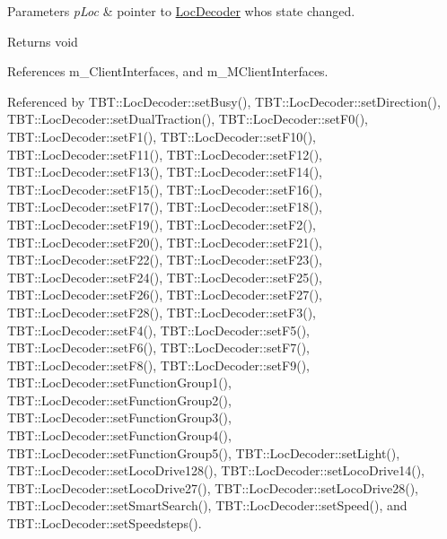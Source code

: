 \begin{DoxyParams}{Parameters}
{\em p\+Loc} & pointer to \hyperlink{classTBT_1_1LocDecoder}{Loc\+Decoder} who\textquotesingle{}s state changed.\\
\hline
\end{DoxyParams}
\begin{DoxyReturn}{Returns}
void 
\end{DoxyReturn}


References m\+\_\+\+Client\+Interfaces, and m\+\_\+\+M\+Client\+Interfaces.



Referenced by T\+B\+T\+::\+Loc\+Decoder\+::set\+Busy(), T\+B\+T\+::\+Loc\+Decoder\+::set\+Direction(), T\+B\+T\+::\+Loc\+Decoder\+::set\+Dual\+Traction(), T\+B\+T\+::\+Loc\+Decoder\+::set\+F0(), T\+B\+T\+::\+Loc\+Decoder\+::set\+F1(), T\+B\+T\+::\+Loc\+Decoder\+::set\+F10(), T\+B\+T\+::\+Loc\+Decoder\+::set\+F11(), T\+B\+T\+::\+Loc\+Decoder\+::set\+F12(), T\+B\+T\+::\+Loc\+Decoder\+::set\+F13(), T\+B\+T\+::\+Loc\+Decoder\+::set\+F14(), T\+B\+T\+::\+Loc\+Decoder\+::set\+F15(), T\+B\+T\+::\+Loc\+Decoder\+::set\+F16(), T\+B\+T\+::\+Loc\+Decoder\+::set\+F17(), T\+B\+T\+::\+Loc\+Decoder\+::set\+F18(), T\+B\+T\+::\+Loc\+Decoder\+::set\+F19(), T\+B\+T\+::\+Loc\+Decoder\+::set\+F2(), T\+B\+T\+::\+Loc\+Decoder\+::set\+F20(), T\+B\+T\+::\+Loc\+Decoder\+::set\+F21(), T\+B\+T\+::\+Loc\+Decoder\+::set\+F22(), T\+B\+T\+::\+Loc\+Decoder\+::set\+F23(), T\+B\+T\+::\+Loc\+Decoder\+::set\+F24(), T\+B\+T\+::\+Loc\+Decoder\+::set\+F25(), T\+B\+T\+::\+Loc\+Decoder\+::set\+F26(), T\+B\+T\+::\+Loc\+Decoder\+::set\+F27(), T\+B\+T\+::\+Loc\+Decoder\+::set\+F28(), T\+B\+T\+::\+Loc\+Decoder\+::set\+F3(), T\+B\+T\+::\+Loc\+Decoder\+::set\+F4(), T\+B\+T\+::\+Loc\+Decoder\+::set\+F5(), T\+B\+T\+::\+Loc\+Decoder\+::set\+F6(), T\+B\+T\+::\+Loc\+Decoder\+::set\+F7(), T\+B\+T\+::\+Loc\+Decoder\+::set\+F8(), T\+B\+T\+::\+Loc\+Decoder\+::set\+F9(), T\+B\+T\+::\+Loc\+Decoder\+::set\+Function\+Group1(), T\+B\+T\+::\+Loc\+Decoder\+::set\+Function\+Group2(), T\+B\+T\+::\+Loc\+Decoder\+::set\+Function\+Group3(), T\+B\+T\+::\+Loc\+Decoder\+::set\+Function\+Group4(), T\+B\+T\+::\+Loc\+Decoder\+::set\+Function\+Group5(), T\+B\+T\+::\+Loc\+Decoder\+::set\+Light(), T\+B\+T\+::\+Loc\+Decoder\+::set\+Loco\+Drive128(), T\+B\+T\+::\+Loc\+Decoder\+::set\+Loco\+Drive14(), T\+B\+T\+::\+Loc\+Decoder\+::set\+Loco\+Drive27(), T\+B\+T\+::\+Loc\+Decoder\+::set\+Loco\+Drive28(), T\+B\+T\+::\+Loc\+Decoder\+::set\+Smart\+Search(), T\+B\+T\+::\+Loc\+Decoder\+::set\+Speed(), and T\+B\+T\+::\+Loc\+Decoder\+::set\+Speedsteps().

